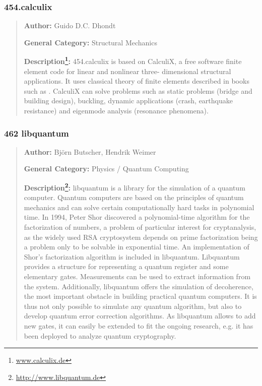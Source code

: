 \documentclass[onecolumn, openany, master, english, seal, signatures]{dbrgrptt}
\begin{document}
\subsubsection{454.calculix}

\begin{quote}
\textbf{Author:} Guido D.C. Dhondt

\textbf{General Category:} Structural Mechanics

\textbf{Description\footnote{\url{www.calculix.de}}:} 454.calculix is based on CalculiX, a free software finite element code for linear and nonlinear three- dimensional structural applications. It uses classical theory of finite elements described in books such as \cite{zienkiewicz1977finite}. CalculiX can solve problems such as static problems (bridge and building design), buckling, dynamic applications (crash, earthquake resistance) and eigenmode analysis (resonance phenomena).
\end{quote}

\subsubsection{462 libquantum}

\begin{quote}
\textbf{Author:} Bj\"orn Butscher, Hendrik Weimer

\textbf{General Category:} Physics / Quantum Computing

\textbf{Description\footnote{\url{http://www.libquantum.de}}:} libquantum is a library for the simulation of a quantum computer. Quantum computers are based on the principles of quantum mechanics and can solve certain computationally hard tasks in polynomial time.
In 1994, Peter Shor discovered a polynomial-time algorithm for the factorization of numbers, a problem of particular interest for cryptanalysis, as the widely used RSA cryptosystem depends on prime factorization being a problem only to be solvable in exponential time. An implementation of Shor's factorization algorithm is included in libquantum.
Libquantum provides a structure for representing a quantum register and some elementary gates. Measurements can be used to extract information from the system. Additionally, libquantum offers the simulation of decoherence, the most important obstacle in building practical quantum computers. It is thus not only possible to simulate any quantum algorithm, but also to develop quantum error correction algorithms. As libquantum allows to add new gates, it can easily be extended to fit the ongoing research, e.g. it has been deployed to analyze quantum cryptography.
\end{quote}
\end{document}
